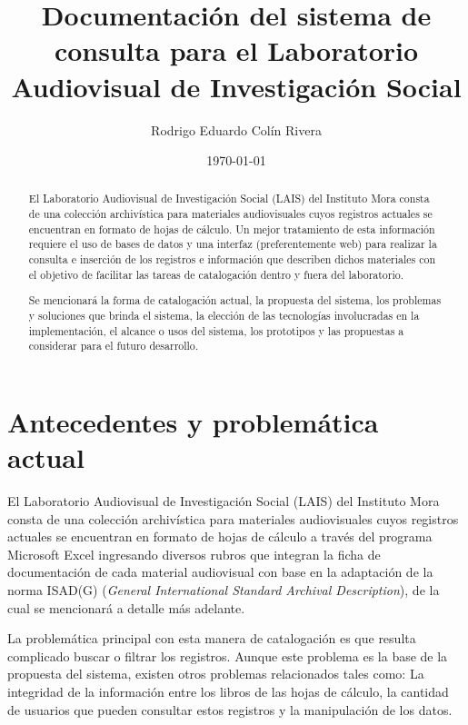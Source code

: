 \documentclass[10pt,letterpaper]{article}
\begin{document}
\title{Documentación del sistema de consulta para el Laboratorio Audiovisual de Investigación Social}
\author{Rodrigo Eduardo Colín Rivera}
\date{\today}
\maketitle

\setcounter{secnumdepth}{0} %
\setcounter{tocdepth}{0} %
\graphicspath{{Diagramas/}} %

\begin{abstract}
El Laboratorio Audiovisual de Investigación Social (LAIS) del Instituto Mora consta de una colección archivística para materiales audiovisuales cuyos registros actuales se encuentran en formato de hojas de cálculo. Un mejor tratamiento de esta información requiere el uso de bases de datos y una interfaz (preferentemente web) para realizar la consulta e inserción de los registros e información que describen dichos materiales con el objetivo de facilitar las tareas de catalogación dentro y fuera del laboratorio.

Se mencionará la forma de catalogación actual, la propuesta del sistema, los problemas y soluciones que brinda el sistema, la elección de las tecnologías involucradas en la implementación, el alcance o usos del sistema, los prototipos y las propuestas a considerar para el futuro desarrollo.
\end{abstract}

\section{Antecedentes y problemática actual}
El Laboratorio Audiovisual de Investigación Social (LAIS) del Instituto Mora consta de una colección archivística para materiales audiovisuales cuyos registros actuales se encuentran en formato de hojas de cálculo a través del programa Microsoft Excel ingresando diversos rubros que integran la ficha de documentación de cada material audiovisual con base en la adaptación de la norma ISAD(G) (\textit{General International Standard Archival Description}), de la cual se mencionará a detalle más adelante.

La problemática principal con esta manera de catalogación es que resulta complicado buscar o filtrar los registros. Aunque este problema es la base de la propuesta del sistema, existen otros problemas relacionados tales como: La integridad de la información entre los libros de las hojas de cálculo, la cantidad de usuarios que pueden consultar estos registros y la manipulación de los datos.
\end{document}
